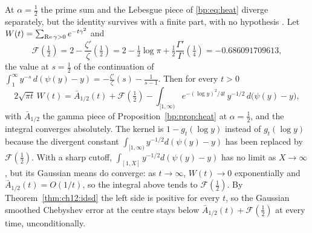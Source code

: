 \begin{remark}\label{bp:rem:centre}
At $\alpha=\frac12$ the prime sum and the Lebesgue piece of \eqref{bp:eq:heat} diverge separately, but the identity survives with a finite part, with no hypothesis \cite{PolsonRXi26}. Let $W(t)=\sum_{\operatorname{Re}\gamma>0}e^{-t\gamma^2}$ and
\[
\mathcal F(\tfrac12)=2-\frac{\zeta'}{\zeta}(\tfrac12)=2-\tfrac12\log\pi+\tfrac12\frac{\Gamma'}{\Gamma}(\tfrac14)=-0.686091709613, 
\]
the value at $s=\frac12$ of the continuation of $\int_1^\infty y^{-s}\,d(\psi(y)-y)=-\frac{\zeta'}{\zeta}(s)-\frac1{s-1}$. Then for every $t>0$
\[
2\sqrt{\pi t}\,W(t)=\bar A_{1/2}(t)+\mathcal F(\tfrac12)-\int_{[1,\infty)}e^{-(\log y)^2/4t}\,y^{-1/2}\,d\bigl(\psi(y)-y\bigr),
\]
with $\bar A_{1/2}$ the gamma piece of Proposition~\ref{bp:prop:heat} at $\alpha=\frac12$, and the integral converges absolutely. The kernel is $1-g_t(\log y)$ instead of $g_t(\log y)$ because the divergent constant $\int_{[1,\infty)}y^{-1/2}d(\psi(y)-y)$ has been replaced by $\mathcal F(\frac12)$. With a sharp cutoff, $\int_{[1,X]}y^{-1/2}d(\psi(y)-y)$ has no limit as $X\to\infty$, but its Gaussian means do converge: as $t\to\infty$, $W(t)\to0$ exponentially and $\bar A_{1/2}(t)=O(1/t)$, so the integral above tends to $\mathcal F(\frac12)$. By Theorem~\ref{thm:ch12:idsd} the left side is positive for every $t$, so the Gaussian smoothed Chebyshev error at the centre stays below $\bar A_{1/2}(t)+\mathcal F(\frac12)$ at every time, unconditionally.
\end{remark}
